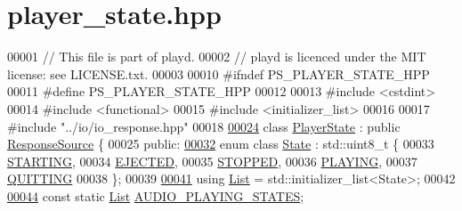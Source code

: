 \hypertarget{player__state_8hpp_source}{\section{player\+\_\+state.\+hpp}
\label{player__state_8hpp_source}
}

\begin{DoxyCode}
00001 \textcolor{comment}{// This file is part of playd.}
00002 \textcolor{comment}{// playd is licenced under the MIT license: see LICENSE.txt.}
00003 
00010 \textcolor{preprocessor}{#ifndef PS\_PLAYER\_STATE\_HPP}
00011 \textcolor{preprocessor}{#define PS\_PLAYER\_STATE\_HPP}
00012 
00013 \textcolor{preprocessor}{#include <cstdint>}
00014 \textcolor{preprocessor}{#include <functional>}
00015 \textcolor{preprocessor}{#include <initializer\_list>}
00016 
00017 \textcolor{preprocessor}{#include "../io/io\_response.hpp"}
00018 
\hypertarget{player__state_8hpp_source_l00024}{}\hyperlink{classPlayerState}{00024} \textcolor{keyword}{class }\hyperlink{classPlayerState}{PlayerState} : \textcolor{keyword}{public} \hyperlink{classResponseSource}{ResponseSource} \{
00025 \textcolor{keyword}{public}:
\hypertarget{player__state_8hpp_source_l00032}{}\hyperlink{classPlayerState_ab013f68ff23d69d677faae624b5dff07}{00032}     \textcolor{keyword}{enum class} \hyperlink{classPlayerState_ab013f68ff23d69d677faae624b5dff07}{State} : std::uint8\_t \{
00033         \hyperlink{classPlayerState_ab013f68ff23d69d677faae624b5dff07a034312d8adc8099c1c6f53aaff745e26}{STARTING}, 
00034         \hyperlink{classPlayerState_ab013f68ff23d69d677faae624b5dff07a209d5541434371bb6b79dc8cca8fa55b}{EJECTED},  
00035         \hyperlink{classPlayerState_ab013f68ff23d69d677faae624b5dff07a09d4d696b4e935115b9313e3c412509a}{STOPPED},  
00036         \hyperlink{classPlayerState_ab013f68ff23d69d677faae624b5dff07a50366a49630a416ab3ccaa004196027e}{PLAYING},  
00037         \hyperlink{classPlayerState_ab013f68ff23d69d677faae624b5dff07a4eb3979af877a3c13830cd69c746e230}{QUITTING}  
00038     \};
00039 
\hypertarget{player__state_8hpp_source_l00041}{}\hyperlink{classPlayerState_a0f4e455f0579f97740855ccc6177c9f1}{00041}     \textcolor{keyword}{using} \hyperlink{classPlayerState_a0f4e455f0579f97740855ccc6177c9f1}{List} = std::initializer\_list<State>;
00042 
\hypertarget{player__state_8hpp_source_l00044}{}\hyperlink{classPlayerState_aa5e7203a1fa44e8bceffe65b6ad2c554}{00044}     \textcolor{keyword}{const} \textcolor{keyword}{static} \hyperlink{classPlayerState_a0f4e455f0579f97740855ccc6177c9f1}{List} \hyperlink{classPlayerState_aa5e7203a1fa44e8bceffe65b6ad2c554}{AUDIO\_PLAYING\_STATES};

\end{DoxyCode}
